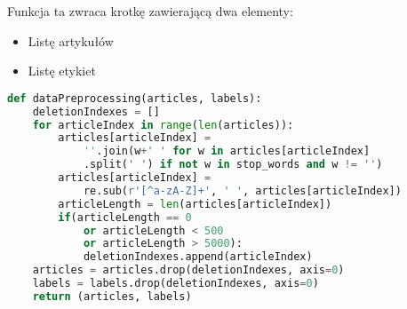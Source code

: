 Funkcja ta zwraca krotkę zawierającą dwa elementy:
\begin{itemize}
    \item Listę artykułów
    \item Listę etykiet
\end{itemize} 

\begin{lstlisting}[language=Python, caption={Funkcja przygotowywująca dane tekstowe}, captionpos=b, frame=single]
def dataPreprocessing(articles, labels):
    deletionIndexes = []
    for articleIndex in range(len(articles)):
        articles[articleIndex] = 
            ''.join(w+' ' for w in articles[articleIndex]
            .split(' ') if not w in stop_words and w != '')  
        articles[articleIndex] = 
            re.sub(r'[^a-zA-Z]+', ' ', articles[articleIndex])
        articleLength = len(articles[articleIndex])
        if(articleLength == 0 
            or articleLength < 500 
            or articleLength > 5000):
            deletionIndexes.append(articleIndex) 
    articles = articles.drop(deletionIndexes, axis=0)
    labels = labels.drop(deletionIndexes, axis=0)
    return (articles, labels)

\end{lstlisting}

